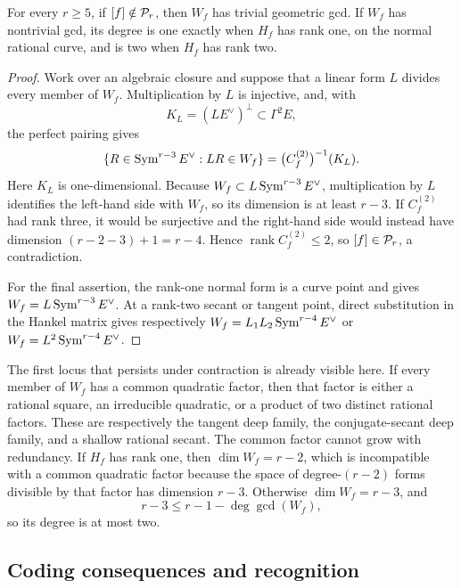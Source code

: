 \begin{lemma}
\label{lem:basepointfree-off-persistent}%
%
For every \(r\geq5\), if \([f]\notin\mathcal P_r\), then \(W_f\) has trivial
geometric gcd.  If \(W_f\) has nontrivial gcd, its degree is one exactly when
\(H_f\) has rank one, on the normal rational curve, and is two when \(H_f\)
has rank two.
\end{lemma}

\begin{proof}
Work over an algebraic closure and suppose that a linear form \(L\) divides
every member of \(W_f\).  Multiplication by \(L\) is injective, and, with
\[
 K_L=(LE^\vee)^\perp\subset\Gamma^2E,
\]
the perfect pairing gives
\[
 \{R\in\operatorname{Sym}^{r-3}E^\vee:LR\in W_f\}
   =\bigl(C_f^{(2)}\bigr)^{-1}(K_L).
\]
Here \(K_L\) is one-dimensional.  Because
\(W_f\subset L\operatorname{Sym}^{r-3}E^\vee\), multiplication by \(L\) identifies the
left-hand side with \(W_f\), so its dimension is at least \(r-3\).  If
\(C_f^{(2)}\) had rank three, it would be surjective and the right-hand side
would instead have dimension \((r-2-3)+1=r-4\).  Hence
\(\operatorname{rank}C_f^{(2)}\leq2\), so \([f]\in\mathcal P_r\), a contradiction.

For the final assertion, the rank-one normal form is a curve point and gives
\(W_f=L\operatorname{Sym}^{r-3}E^\vee\).  At a rank-two secant or tangent point, direct
substitution in the Hankel matrix gives respectively
\(W_f=L_1L_2\operatorname{Sym}^{r-4}E^\vee\) or
\(W_f=L^2\operatorname{Sym}^{r-4}E^\vee\).
\end{proof}

The first locus that persists under contraction is already visible
here.  If every member of $W_f$ has a common quadratic factor, then
that factor is either a
rational square, an irreducible quadratic, or a product of two distinct
rational factors.  These are respectively the tangent deep family, the
conjugate-secant deep family, and a shallow rational secant.  The common
factor cannot grow with redundancy.  If \(H_f\) has rank one, then
\(\dim W_f=r-2\), which is incompatible with a common quadratic factor
because the space of degree-\((r-2)\) forms divisible by that factor has
dimension \(r-3\).  Otherwise \(\dim W_f=r-3\), and
\[
 r-3\leq r-1-\deg\gcd(W_f),
\]
so its degree is at most two.

\subsection{Coding consequences and recognition}

